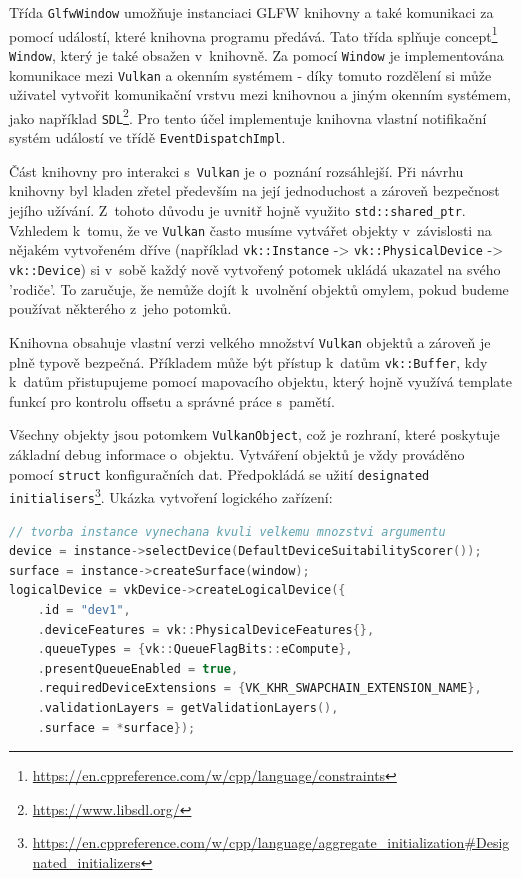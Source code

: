 Třída \texttt{GlfwWindow} umožňuje instanciaci GLFW knihovny a také komunikaci za pomocí událostí, které knihovna programu předává. Tato třída splňuje concept\footnote{\url{https://en.cppreference.com/w/cpp/language/constraints}} \texttt{Window}, který je také obsažen v~knihovně. Za pomocí \texttt{Window} je implementována komunikace mezi \texttt{Vulkan} a okenním systémem - díky tomuto rozdělení si může uživatel vytvořit komunikační vrstvu mezi knihovnou a jiným okenním systémem, jako například \texttt{SDL}\footnote{\url{https://www.libsdl.org/}}. Pro tento účel implementuje knihovna vlastní notifikační systém událostí ve třídě \texttt{EventDispatchImpl}.

Část knihovny pro interakci s~\texttt{Vulkan} je o~poznání rozsáhlejší. Při návrhu knihovny byl kladen zřetel především na její jednoduchost a zároveň bezpečnost jejího užívání. Z~tohoto důvodu je uvnitř hojně využito \texttt{std::shared\_ptr}. Vzhledem k~tomu, že ve \texttt{Vulkan} často musíme vytvářet objekty v~závislosti na nějakém vytvořeném dříve (například \texttt{vk::Instance} -> \texttt{vk::PhysicalDevice} -> \texttt{vk::Device}) si v~sobě každý nově vytvořený potomek ukládá ukazatel na svého 'rodiče'. To zaručuje, že nemůže dojít k~uvolnění objektů omylem, pokud budeme používat některého z~jeho potomků.

Knihovna obsahuje vlastní verzi velkého množství \texttt{Vulkan} objektů a zároveň je plně typově bezpečná. Příkladem může být přístup k~datům \texttt{vk::Buffer}, kdy k~datům přistupujeme pomocí mapovacího objektu, který hojně využívá template funkcí pro kontrolu offsetu a správné práce s~pamětí.

Všechny objekty jsou potomkem \texttt{VulkanObject}, což je rozhraní, které poskytuje základní debug informace o~objektu. Vytváření objektů je vždy prováděno pomocí \texttt{struct} konfiguračních dat. Předpokládá se užití \texttt{designated initialisers}\footnote{\url{https://en.cppreference.com/w/cpp/language/aggregate_initialization#Designated_initializers}}. Ukázka vytvoření logického zařízení:

\begin{lstlisting}[language=C++, caption={Tvorba logického zařízení}]
// tvorba instance vynechana kvuli velkemu mnozstvi argumentu
device = instance->selectDevice(DefaultDeviceSuitabilityScorer());
surface = instance->createSurface(window);
logicalDevice = vkDevice->createLogicalDevice({
    .id = "dev1",
    .deviceFeatures = vk::PhysicalDeviceFeatures{},
    .queueTypes = {vk::QueueFlagBits::eCompute},
    .presentQueueEnabled = true,
    .requiredDeviceExtensions = {VK_KHR_SWAPCHAIN_EXTENSION_NAME},
    .validationLayers = getValidationLayers(),
    .surface = *surface});
\end{lstlisting}

